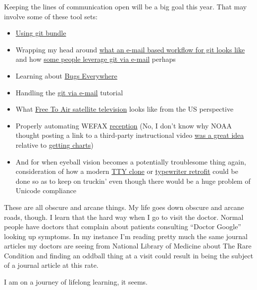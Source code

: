 Keeping the lines of communication open will be a big goal this year.
That may involve some of these tool sets:

\begin{itemize}
\tightlist
\item
  \href{https://web.archive.org/web/20240112005127/https://git-scm.com/book/en/v2/Git-Tools-Bundling}{Using
  git bundle}\\
\item
  Wrapping my head around
  \href{https://web.archive.org/web/20231221173431/https://drewdevault.com/2018/07/02/Email-driven-git.html}{what
  an e-mail based workflow for git looks like} and how
  \href{https://web.archive.org/web/20231219095927/https://begriffs.com/posts/2018-06-05-mailing-list-vs-github.html}{some
  people leverage git via e-mail} perhaps\\
\item
  Learning about
  \href{https://web.archive.org/web/20231225131129/http://bugseverywhere.org/}{Bugs
  Everywhere}
\item
  Handling the \href{https://git-send-email.io/\#step-1}{git via e-mail}
  tutorial
\item
  What
  \href{https://web.archive.org/web/20230324145621/https://www.wikihow.com/Install-and-Set-Up-Free-to-Air-Satellite-TV-Program-Receiver-System}{Free
  To Air satellite television} looks like from the US perspective
\item
  Properly automating WEFAX
  \href{https://www.youtube.com/watch?v=l1QyDVgclto}{reception} (No, I
  don't know why NOAA thought posting a link to a third-party
  instructional video
  \href{https://web.archive.org/web/20231123151628/https://www.weather.gov/marine/radiofax_charts}{was
  a great idea} relative to
  \href{https://web.archive.org/web/20240129060301/https://www.weather.gov/media/marine/rfaxatl.txt}{getting
  charts})
\item
  And for when eyeball vision becomes a potentially troublesome thing
  again, consideration of how a modern
  \href{https://web.archive.org/web/20231223180025/https://drewdevault.com/2019/10/30/Line-printer-shell-hack.html}{TTY
  clone} or
  \href{https://web.archive.org/web/20230610191232/https://hackaday.com/2019/11/14/upgrade-board-turns-typewriter-into-a-teletype/}{typewriter
  retrofit} could be done so as to keep on truckin' even though there
  would be a huge problem of Unicode compliance
\end{itemize}

These are all obscure and arcane things. My life goes down obscure and
arcane roads, though. I learn that the hard way when I go to visit the
doctor. Normal people have doctors that complain about patients
consulting ``Doctor Google'' looking up symptoms. In my instance I'm
reading pretty much the same journal articles my doctors are seeing from
National Library of Medicine about The Rare Condition and finding an
oddball thing at a visit could result in being the subject of a journal
article at this rate.

I am on a journey of lifelong learning, it seems.
